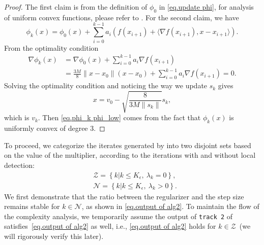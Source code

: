 \documentclass{mcom-l}
\numberwithin{equation}{section}
\begin{document}
\begin{proof}
    The first claim is from the definition of $\phi_0$ in \eqref{eq.update phi}, for analysis of uniform convex functions, please refer to \citet[Section 4.2.2]{nesterov_lectures_2018}. For the second claim, we have
    \begin{equation}
        \label{eq.phi recursive}
        \phi_k(x) = \phi_0(x)+\sum_{i=0}^{k-1}a_i\left (f(x_{i+1})+\langle \nabla f(x_{i+1}),x-x_{i+1}\rangle \right).
    \end{equation}
    From the optimality condition
    \begin{equation*}
        \begin{aligned}
            \nabla \phi_k(x) & = \nabla \phi_0(x)+ \sum_{i=0}^{k-1} a_i\nabla f(x_{i+1})                \\
                             & = \frac{3M}{8}\|x-x_0\|(x-x_0)+\sum_{i=0}^{k-1} a_i\nabla f(x_{i+1}) =0.
        \end{aligned}
    \end{equation*}
    Solving the optimality condition and noticing the way we update $s_k$ gives
    \begin{equation*}
        x = v_0 - \sqrt{\frac{8}{3M\|s_{k}\|}}s_{k},
    \end{equation*}
    which is $v_k$. Then \eqref{eq.phi_k phi_low} comes from the fact that $\phi_k(x)$ is uniformly convex of degree 3.
\end{proof}
To proceed, we categorize the iterates generated by  into two disjoint sets based on the value of the multiplier, according to the iterations with and without local detection:
\begin{equation}
    \label{eq.outer index catagory}
    \begin{aligned}
         & \mathcal{Z} = \left \{k |k\leq K_\epsilon,\ \lambda_k=0\right\},   \\
         & \mathcal{N} = \left \{ k | k\leq K_\epsilon,\ \lambda_k>0\right\}.
    \end{aligned}
\end{equation}
We first demonstrate that the ratio between the regularizer and the step size remains stable for $k\in\mathcal{N}$, as shown in \eqref{eq.output of alg2}. To maintain the flow of the complexity analysis, we temporarily assume the output of \texttt{track 2} of  satisfies~\eqref{eq.output of alg2} as well, i.e., \eqref{eq.output of alg2} holds for $k\in\mathcal{Z}$~(we will rigorously verify this later).
\end{document}
